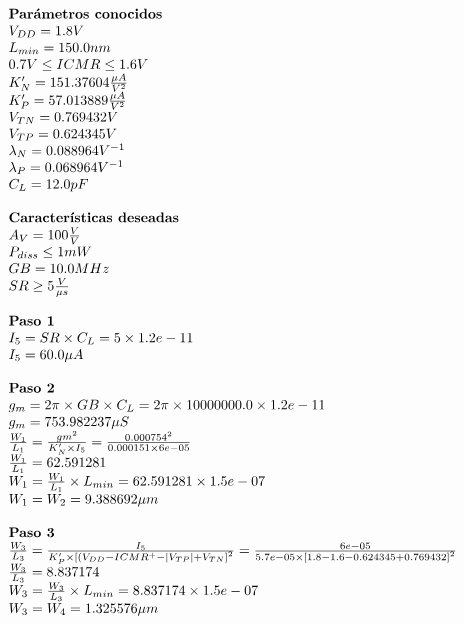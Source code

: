 \begin{equation*}
	\begin{array}{l l}
		\textbf{Parámetros conocidos} \\
		V_{DD} =  1.8  V \\
		L_{min} =  150.0  nm \\
		0.7 V \leq ICMR \leq 1.6 V \\
		K'_{N} =  151.37604  \frac{\mu A}{V^{2}} \\
		K'_{P} =  57.013889  \frac{\mu A}{V^{2}} \\
		V_{TN} =  0.769432  V \\
		V_{TP} =  0.624345  V \\
		\lambda_{N} =  0.088964  V^{-1} \\
		\lambda_{P} =  0.068964  V^{-1} \\
		C_{L} =  12.0  pF \\
		\\
		\textbf{Características deseadas} \\
		A_{V} =  100  \frac{V}{V} \\
		P_{diss} \leq  1  mW \\
		GB =  10.0  MHz \\
		SR \geq  5  \frac{V}{\mu s} \\
		\\
		\textbf{Paso 1} \\
		I_{5} = SR \times C_{L} = 5\times1.2e-11 \\
		I_{5} =  60.0 \mu A \\
		\\
		\textbf{Paso 2} \\
		g_{m} = 2\pi{} \times GB \times C_{L} = 2 \pi{} \times10000000.0\times 1.2e-11  \\
		g_{m} =  753.982237  \mu S \\
		\frac{W_1}{L_1} = \frac{gm^2}{K'_{N}\times I_5} = \frac{0.000754^2}{0.000151\times6e-05}\\
		\frac{W_1}{L_1} =  62.591281  \\
		W_{1} = \frac{W_1}{L_1} \times L_{min} =  62.591281 \times 1.5e-07  \\
		W_{1} = W_{2} =  9.388692  \mu m \\
		\\
		\textbf{Paso 3} \\
		\frac{W_3}{L_3} = \frac{I_5}{K'_{P}\times \left[(V_{DD}-ICMR^{+}-|V_{TP}|+V_{TN}\right]^{2}} = \frac{ 6e-05 }{ 5.7e-05 \times \left[ 1.8 - 1.6 - 0.624345 + 0.769432 \right]^{2}} \\
		\frac{W_3}{L_3} =  8.837174  \\
		W_{3} = \frac{W_3}{L_3} \times L_{min} =  8.837174 \times 1.5e-07  \\
		W_{3} = W_{4} =  1.325576  \mu m \\
	\end{array}
\end{equation*}

